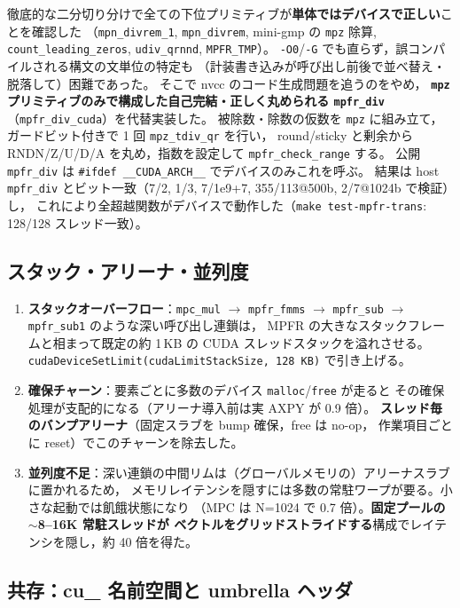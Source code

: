 \documentclass[uplatex,dvipdfmx,a4paper,11pt]{jsarticle}
\newcommand{\code}[1]{\texttt{#1}}
\begin{document}
徹底的な二分切り分けで全ての下位プリミティブが\textbf{単体ではデバイスで正しい}ことを確認した
（\code{mpn\_divrem\_1}, \code{mpn\_divrem}, mini-gmp の \code{mpz} 除算,
\code{count\_leading\_zeros}, \code{udiv\_qrnnd}, \code{MPFR\_TMP}）。
\code{-O0}/\code{-G} でも直らず，誤コンパイルされる構文の文単位の特定も
（計装書き込みが呼び出し前後で並べ替え・脱落して）困難であった。
そこで nvcc のコード生成問題を追うのをやめ，
\textbf{\code{mpz} プリミティブのみで構成した自己完結・正しく丸められる
\code{mpfr\_div}}（\code{mpfr\_div\_cuda}）を代替実装した。
被除数・除数の仮数を \code{mpz} に組み立て，ガードビット付きで 1 回 \code{mpz\_tdiv\_qr} を行い，
round/sticky と剰余から RNDN/Z/U/D/A を丸め，指数を設定して \code{mpfr\_check\_range} する。
公開 \code{mpfr\_div} は \code{\#ifdef \_\_CUDA\_ARCH\_\_} でデバイスのみこれを呼ぶ。
結果は host \code{mpfr\_div} とビット一致（7/2, 1/3, 7/1e9+7, 355/113@500b, 2/7@1024b で検証）し，
これにより全超越関数がデバイスで動作した（\code{make test-mpfr-trans}: 128/128 スレッド一致）。

\subsection{スタック・アリーナ・並列度}

\begin{enumerate}
\item \textbf{スタックオーバーフロー}：\code{mpc\_mul} $\to$ \code{mpfr\_fmms} $\to$
      \code{mpfr\_sub} $\to$ \code{mpfr\_sub1} のような深い呼び出し連鎖は，
      MPFR の大きなスタックフレームと相まって既定の約 1\,KB の CUDA スレッドスタックを溢れさせる。
      \code{cudaDeviceSetLimit(cudaLimitStackSize, 128\,KB)} で引き上げる。
\item \textbf{確保チャーン}：要素ごとに多数のデバイス \code{malloc}/\code{free} が走ると
      その確保処理が支配的になる（アリーナ導入前は実 AXPY が 0.9 倍）。
      \textbf{スレッド毎のバンプアリーナ}（固定スラブを bump 確保，free は no-op，
      作業項目ごとに reset）でこのチャーンを除去した。
\item \textbf{並列度不足}：深い連鎖の中間リムは（グローバルメモリの）アリーナスラブに置かれるため，
      メモリレイテンシを隠すには多数の常駐ワープが要る。小さな起動では飢餓状態になり
      （MPC は N=1024 で 0.7 倍）。\textbf{固定プールの $\sim$8--16K 常駐スレッドが
      ベクトルをグリッドストライドする}構成でレイテンシを隠し，約 40 倍を得た。
\end{enumerate}

\subsection{共存：cu\_ 名前空間と umbrella ヘッダ}
\end{document}
